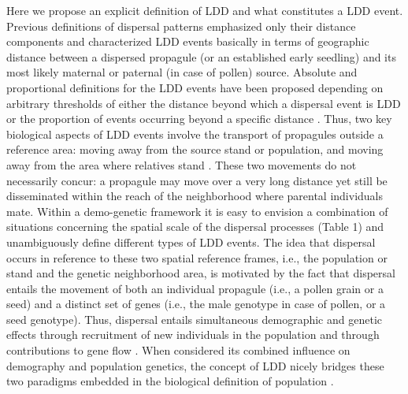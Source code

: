 \documentclass[a4paper, 12pt]{article}
\begin{document}
\begin{linenumbers}
Here we propose an explicit definition of LDD and what constitutes a LDD event. Previous definitions of dispersal patterns emphasized only their distance components and characterized LDD events basically in terms of geographic distance between a dispersed propagule (or an established early seedling) and its most likely maternal or paternal (in case of pollen) source. Absolute and proportional definitions for the LDD events have been proposed depending on arbitrary thresholds of either the distance beyond which a dispersal event is LDD or the proportion of events occurring beyond a specific distance \citep{Nathan:2005jc, Nathan:2008is}. Thus, two key biological aspects of LDD events involve the transport of propagules outside a reference area: moving away from the source stand or population, and moving away from the area where relatives stand \citep{Kinlan:2005fb}. These two movements do not necessarily concur: a propagule may move over a very long distance yet still be disseminated within the reach of the neighborhood where parental individuals mate. Within a demo-genetic framework it is easy to envision a combination of situations concerning the spatial scale of the dispersal processes (Table 1) and unambiguously define different types of LDD events. The idea that dispersal occurs in reference to these two spatial reference frames, i.e., the population or stand and the genetic neighborhood area, is motivated by the fact that dispersal entails the movement of both an individual propagule (i.e., a pollen grain or a seed) and a distinct set of genes (i.e., the male genotype in case of pollen, or a seed genotype). Thus, dispersal entails simultaneous demographic and genetic effects through recruitment of new individuals in the population and through contributions to gene flow \citep{Harper:1977aa}. When considered its combined influence on demography and population genetics, the concept of LDD nicely bridges these two paradigms embedded in the biological definition of population \citep{Waples:2006ev}. 
 

\end{linenumbers}
\end{document}
